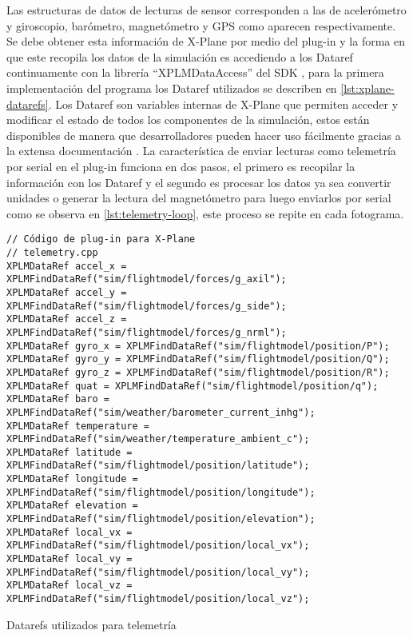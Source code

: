 Las estructuras de datos de lecturas de sensor corresponden a las de acelerómetro y giroscopio, barómetro, magnetómetro y GPS como aparecen respectivamente. Se debe obtener esta información de X-Plane por medio del plug-in y la forma en que este recopila los datos de la simulación es accediendo a los Dataref continuamente con la librería ``XPLMDataAccess'' del SDK \cite{xplane-dataref}, para la primera implementación del programa los Dataref utilizados se describen en \cref{lst:xplane-datarefs}. Los Dataref son variables internas de X-Plane que permiten acceder y modificar el estado de todos los componentes de la simulación, estos están disponibles de manera que desarrolladores pueden hacer uso fácilmente gracias a la extensa documentación \cite{xplane-dataref-ref}. La característica de enviar lecturas como telemetría por serial en el plug-in funciona en dos pasos, el primero es recopilar la información con los Dataref y el segundo es procesar los datos ya sea convertir unidades o generar la lectura del magnetómetro para luego enviarlos por serial como se observa en \cref{lst:telemetry-loop}, este proceso se repite en cada fotograma.

\begin{listing}[h]
    \begin{verbatim}
// Código de plug-in para X-Plane
// telemetry.cpp
XPLMDataRef accel_x = XPLMFindDataRef("sim/flightmodel/forces/g_axil");
XPLMDataRef accel_y = XPLMFindDataRef("sim/flightmodel/forces/g_side");
XPLMDataRef accel_z = XPLMFindDataRef("sim/flightmodel/forces/g_nrml");
XPLMDataRef gyro_x = XPLMFindDataRef("sim/flightmodel/position/P");
XPLMDataRef gyro_y = XPLMFindDataRef("sim/flightmodel/position/Q");
XPLMDataRef gyro_z = XPLMFindDataRef("sim/flightmodel/position/R");
XPLMDataRef quat = XPLMFindDataRef("sim/flightmodel/position/q");
XPLMDataRef baro = XPLMFindDataRef("sim/weather/barometer_current_inhg");
XPLMDataRef temperature = XPLMFindDataRef("sim/weather/temperature_ambient_c");
XPLMDataRef latitude = XPLMFindDataRef("sim/flightmodel/position/latitude");
XPLMDataRef longitude = XPLMFindDataRef("sim/flightmodel/position/longitude");
XPLMDataRef elevation = XPLMFindDataRef("sim/flightmodel/position/elevation");
XPLMDataRef local_vx = XPLMFindDataRef("sim/flightmodel/position/local_vx");
XPLMDataRef local_vy = XPLMFindDataRef("sim/flightmodel/position/local_vy");
XPLMDataRef local_vz = XPLMFindDataRef("sim/flightmodel/position/local_vz");
    \end{verbatim}
    \caption{Datarefs utilizados para telemetría}
    \label{lst:xplane-datarefs}
\end{listing}

